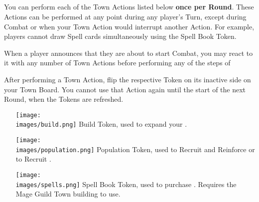 \begin{multicols*}{2}
\subsection*{}
You can perform each of the Town Actions listed below \textbf{once per Round}.
These Actions can be performed at any point during any player's Turn, except during Combat or when your Town Action would interrupt another Action.
For example, players cannot draw Spell cards simultaneously using the Spell Book Token.\par
When a player announces that they are about to start Combat, you may react to it with any number of Town Actions before performing any of the steps of \par
After performing a Town Action, flip the respective Token on its inactive side on your Town Board.
You cannot use that Action again until the start of the next Round, when the Tokens are refreshed.
\begin{itemize}
  \item [{\texttt{[image: \\images/build.png]}}] Build Token, used to expand your .
  \item [{\texttt{[image: \\images/population.png]}}] Population Token, used to Recruit and Reinforce  or to Recruit .
  \item [{\texttt{[image: \\images/spells.png]}}]Spell Book Token, used to purchase . Requires the Mage Guild Town building to use.
\end{itemize}


\end{multicols*}
